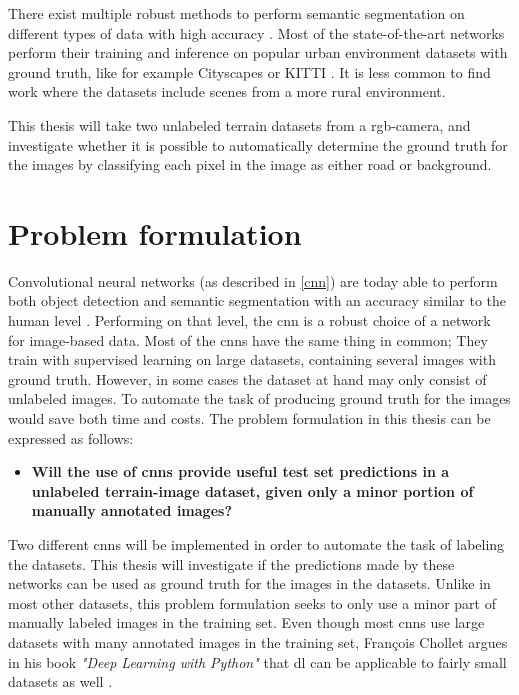 \documentclass[USenglish]{ifimaster}  %
\begin{document}
There exist multiple robust methods to perform semantic segmentation on different types of data with high accuracy \cite{website:deeplab_article} \cite{website:fcn} \cite{website:u_net_article}. Most of the state-of-the-art networks perform their training and inference on popular urban environment datasets with ground truth, like for example Cityscapes \cite{website:cityscapes_web} or KITTI \cite{website:kitti}. It is less common to find work where the datasets include scenes from a more rural environment.    

This thesis will take two unlabeled terrain datasets from a \ac{rgb}-camera, and investigate whether it is possible to automatically determine the ground truth for the images by classifying each pixel in the image as either road or background.

\section{Problem formulation}\label{problem_formulation}
Convolutional neural networks (as described in \vref{cnn}) are today able to perform both object detection and semantic segmentation with an accuracy similar to the human level \cite{website:cnn}. Performing on that level, the \ac{cnn} is a robust choice of a network for image-based data. Most of the \acp{cnn} have the same thing in common; They train with supervised learning on large datasets, containing several images with ground truth. However, in some cases the dataset at hand may only consist of unlabeled images. To automate the task of producing ground truth for the images would save both time and costs. The problem formulation in this thesis can be expressed as follows:
\begin{itemize}
\centering
  \item[] \textbf{Will the use of \acp{cnn} provide useful test set predictions in a unlabeled terrain-image dataset, given only a minor portion of manually annotated images?} 
\end{itemize}

Two different \acp{cnn} will be implemented in order to automate the task of labeling the datasets. This thesis will investigate if the predictions made by these networks can be used as ground truth for the images in the datasets. Unlike in most other datasets, this problem formulation seeks to only use a minor part of manually labeled images in the training set. Even though most \acp{cnn} use large datasets with many annotated images in the training set, François Chollet argues in his book \textit{"Deep Learning with Python"} that \acf{dl} can be applicable to fairly small datasets as well \cite{Francois_Deep_learning_with_python}. 
\end{document}

